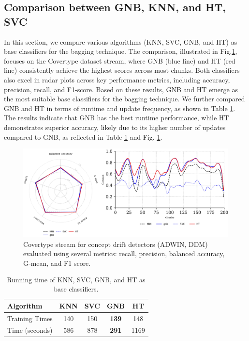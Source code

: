 \subsection{Comparison between GNB, KNN, and HT, SVC}
\label{sec:compared_base_calssfier}
In this section, we compare various algorithms (KNN, SVC, GNB, and HT) as base classifiers for the bagging technique. The comparison, illustrated in Fig.\ref{fig:res4}, focuses on the Covertype dataset stream, where GNB (blue line) and HT (red line) consistently achieve the highest scores across most chunks. Both classifiers also excel in radar plots across key performance metrics, including accuracy, precision, recall, and F1-score. Based on these results, GNB and HT emerge as the most suitable base classifiers for the bagging technique. We further compared GNB and HT in terms of runtime and update frequency, as shown in Table \ref{table:table_3}. The results indicate that GNB has the best runtime performance, while HT demonstrates superior accuracy, likely due to its higher number of updates compared to GNB, as reflected in Table \ref{table:table_3} and Fig. \ref{fig:res4}.

\begin{figure}[t]
	\centering
	\includegraphics[width=1\linewidth]{5_Emerging/images/res4.png}
	\caption{Covertype stream for concept drift detectors (ADWIN, DDM) evaluated using several metrics: recall, precision, balanced accuracy, G-mean, and F1 score.}

	\label{fig:res4}
\end{figure}				

	
\begin{table}[t]
	\centering
	\caption{Running time of KNN, SVC, GNB, and HT as base classifiers.}
	\begin{tabular}{|l|c|c|c|c|}
	\hline
	\textbf{Algorithm}     & \textbf{KNN} & \textbf{SVC} & \textbf{GNB} & \textbf{HT} \\ \hline
		Training Times         & 140          & 150          & \textbf{139} & 148         \\ \hline
		Time (seconds)         & 586          & 878          & \textbf{291} & 1169        \\ \hline
	\end{tabular}
	\label{table:table_3}
	\end{table}


